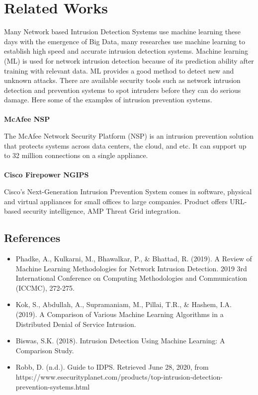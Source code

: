 \documentclass[submission,copyright,creativecommons]{eptcs}
\begin{document}
\section{Related Works}

Many Network based Intrusion Detection Systems use machine learning these days with the emergence of Big Data, many researches use machine learning to establish high speed and accurate intrusion detection systems. Machine learning (ML) is used for network intrusion detection because of its prediction ability after training with relevant data. ML provides a good method to detect new and unknown attacks. There are available security tools such as network intrusion detection and prevention systems to spot intruders before they can do serious damage. Here some of the examples of intrusion prevention systems.\\
\\
\textbf{McAfee NSP}

The McAfee Network Security Platform (NSP) is an intrusion prevention solution that protects systems across data centers, the cloud, and etc. It can support up to 32 million connections on a single appliance.\cite{b2}\\
\\
\textbf{Cisco Firepower NGIPS}

Cisco's Next-Generation Intrusion Prevention System comes in software, physical and virtual appliances for small offices to large companies. Product offers URL-based security intelligence, AMP Threat Grid integration.\cite{b2}
\subsection{References}
\begin{itemize}
    \item Phadke, A., Kulkarni, M., Bhawalkar, P., \& Bhattad, R. (2019). A Review of Machine Learning Methodologies for Network Intrusion Detection. 2019 3rd International Conference on Computing Methodologies and Communication (ICCMC), 272-275.
    \item Kok, S., Abdullah, A., Supramaniam, M., Pillai, T.R., \& Hashem, I.A. (2019). A Comparison of Various Machine Learning Algorithms in a Distributed Denial of Service Intrusion.
    \item Biswas, S.K. (2018). Intrusion Detection Using Machine Learning: A Comparison Study.
    \item Robb, D. (n.d.). Guide to IDPS. Retrieved June 28, 2020, from https://www.esecurityplanet.com/products/top-intrusion-detection-prevention-systems.html

\end{itemize}
\end{document}
